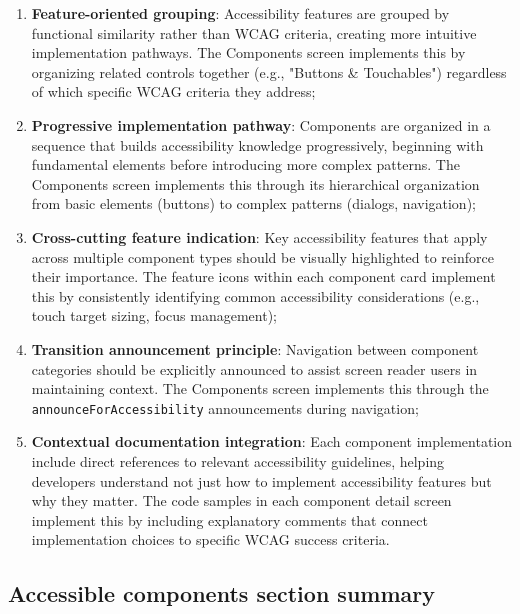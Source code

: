 \begin{enumerate}
    \item \textbf{Feature-oriented grouping}: Accessibility features are grouped by functional similarity rather than WCAG criteria, creating more intuitive implementation pathways. The Components screen implements this by organizing related controls together (e.g., "Buttons \& Touchables") regardless of which specific WCAG criteria they address;
    
    \item \textbf{Progressive implementation pathway}: Components are organized in a sequence that builds accessibility knowledge progressively, beginning with fundamental elements before introducing more complex patterns. The Components screen implements this through its hierarchical organization from basic elements (buttons) to complex patterns (dialogs, navigation);
    
    \item \textbf{Cross-cutting feature indication}: Key accessibility features that apply across multiple component types should be visually highlighted to reinforce their importance. The feature icons within each component card implement this by consistently identifying common accessibility considerations (e.g., touch target sizing, focus management);
    
    \item \textbf{Transition announcement principle}: Navigation between component categories should be explicitly announced to assist screen reader users in maintaining context. The Components screen implements this through the \texttt{announceForAccessibility} announcements during navigation;
    
    \item \textbf{Contextual documentation integration}: Each component implementation include direct references to relevant accessibility guidelines, helping developers understand not just how to implement accessibility features but why they matter. The code samples in each component detail screen implement this by including explanatory comments that connect implementation choices to specific WCAG success criteria.
\end{enumerate}

\FloatBarrier 

\subsection{Accessible components section summary}
\label{subsec:accessible-components-summary}

